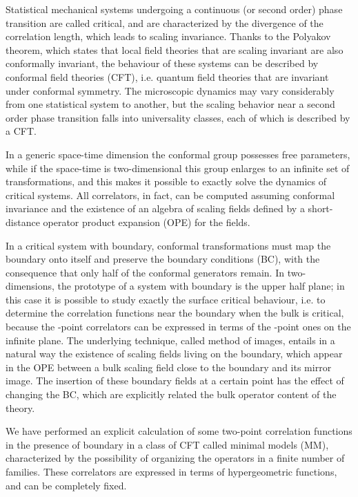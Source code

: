 \documentclass[a4paper,12pt]{report}
\begin{document}
Statistical mechanical systems undergoing a continuous (or second order) phase transition are called critical, and
are characterized by the divergence of the correlation length, which leads to scaling invariance. Thanks to the
Polyakov theorem, which states that local field theories that are scaling invariant are also conformally
invariant, the behaviour of these systems can be described by conformal field theories (CFT), i.e. quantum field
theories that are invariant under conformal symmetry. The microscopic dynamics may vary considerably from one
statistical system to another, but the scaling behavior near a second order phase transition falls into
universality classes, each of which is described by a CFT.

In a generic space-time dimension \coordHE{} the conformal group possesses \coordHE{} free parameters, while if the
space-time is two-dimensional this group enlarges to an infinite set of transformations, and this makes it
possible to exactly solve the dynamics of critical systems. All correlators, in fact, can be computed assuming
conformal invariance and the existence of an algebra of scaling fields defined by a short-distance operator
product expansion (OPE) for the fields.

In a critical system with boundary, conformal transformations must map the boundary onto itself and preserve the
boundary conditions (BC), with the consequence that only half of the conformal generators remain. In
two-dimensions, the prototype of a system with boundary is the upper half plane; in this case it is possible to
study exactly the surface critical behaviour, i.e. to determine the correlation functions near the boundary when
the bulk is critical, because the \coordHE{}-point correlators can be expressed in terms of the \coordHE{}-point ones on the
infinite plane. The underlying technique, called method of images, entails in a natural way the existence of
scaling fields living on the boundary, which appear in the OPE between a bulk scaling field close to the boundary
and its mirror image. The insertion of these boundary fields at a certain point has the effect of changing the BC,
which are explicitly related the bulk operator content of the theory.

We have performed an explicit calculation of some two-point correlation functions in the presence of boundary in a
class of CFT called minimal models (MM), characterized by the possibility of organizing the operators in a finite
number of families. These correlators are expressed in terms of hypergeometric functions, and can be completely
fixed.
\end{document}
